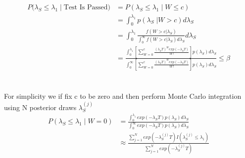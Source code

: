 \documentclass[12pt]{article}
\begin{document}
$$
\begin{aligned}
    P(\lambda_S \leq \lambda_1 \; \vert \; \text{Test Is Passed)} &= P(\lambda_S
    \leq \lambda_1 \; \vert \; W \leq c) \\ &= \int_{0}^{\lambda_1} p(\lambda_S \;
    \vert W > c) d\lambda_S \\ &= \int_{0}^{\lambda_1} \frac{f(W > c \vert
    \lambda_S)}{\int_{0}^{\infty} f(W > c \vert \lambda_S) d\lambda_S} d\lambda_S \\ &=
    \frac{\int_{0}^{\lambda_1} [ \sum_{W=0}^c \frac{(\lambda_S T)^W
    exp(-\lambda_S T)}{W!}]p(\lambda_S)d\lambda_S} {\int_{0}^{\infty} [
    \sum_{W=0}^c \frac{(\lambda_S T)^W exp(-\lambda_S
    T)}{W!}]p(\lambda_S)d\lambda_S} \leq \beta
\end{aligned}
$$
\\
\\
For simplicity we if fix c to be zero and then perform Monte Carlo integration
using N posterior draws $ \lambda_S^{(j)} $ $$
\begin{aligned}
	 P(\lambda_S \leq \lambda_1 \; \vert \; W = 0) &= \frac{\int_{0}^{\lambda_1}
	 exp(-\lambda_S T)p(\lambda_S)d\lambda_S} {\int_{0}^{\infty} exp(-\lambda_S
	 T)p(\lambda_S)d\lambda_S} \\ &\approx \frac{\sum_{j = 1}^{N}
	 exp(-\lambda_S^{(j)} T)I(\lambda_S^{(j)} \leq \lambda_1)} {\sum_{j = 1}^{N}
	 exp(-\lambda_S^{(j)} T)}
\end{aligned}
$$
\end{document}
